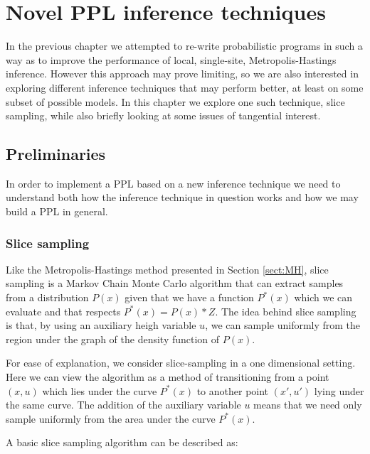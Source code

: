 \chapter{Novel PPL inference techniques}
\label{chap:infEngines}

In the previous chapter we attempted to re-write probabilistic programs in such a way as to improve the performance of local, single-site, Metropolis-Hastings inference. However this approach may prove limiting, so we are also interested in exploring different inference techniques that may perform better, at least on some subset of possible models. In this chapter we explore one such technique, slice sampling, while also briefly looking at some issues of tangential interest.

\section{Preliminaries}
In order to implement a PPL based on a new inference technique we need to understand both how the inference technique in question works and how we may build a PPL in general.

\subsection{Slice sampling}
\label{sect:sliceBack}
Like the Metropolis-Hastings method presented in Section \ref{sect:MH}, slice sampling is a Markov Chain Monte Carlo algorithm that can extract samples from a distribution $P(x)$ given that we have a function $P^*(x)$ which we can evaluate and that respects $P^*(x) = P(x)*Z$. The idea behind slice sampling is that, by using an auxiliary heigh variable $u$, we can sample uniformly from the region under the graph of the density function of $P(x)$.

For ease of explanation, we consider slice-sampling in a one dimensional setting. Here we can view the algorithm as a method of transitioning from a point $(x,u)$ which lies under the curve $P^*(x)$ to another point $(x',u')$ lying under the same curve. The addition of the auxiliary variable $u$ means that we need only sample uniformly from the area under the curve $P^*(x)$.

A basic slice sampling algorithm can be described as:


